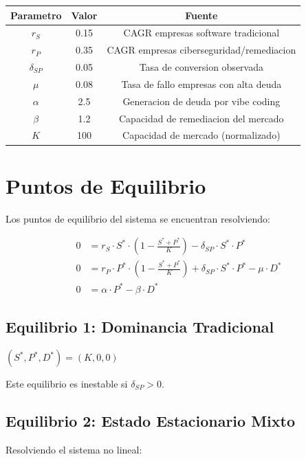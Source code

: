 \documentclass{article}
\begin{document}
\begin{table}[h]
\centering
\begin{tabular}{|c|c|c|}
\hline
\textbf{Parametro} & \textbf{Valor} & \textbf{Fuente} \\
\hline
$r_S$ & 0.15 & CAGR empresas software tradicional \\
$r_P$ & 0.35 & CAGR empresas ciberseguridad/remediacion \\
$\delta_{SP}$ & 0.05 & Tasa de conversion observada \\
$\mu$ & 0.08 & Tasa de fallo empresas con alta deuda \\
$\alpha$ & 2.5 & Generacion de deuda por vibe coding \\
$\beta$ & 1.2 & Capacidad de remediacion del mercado \\
$K$ & 100 & Capacidad de mercado (normalizado) \\
\hline
\end{tabular}
\end{table}

\section{Puntos de Equilibrio}

Los puntos de equilibrio del sistema se encuentran resolviendo:

\begin{align}
0 &= r_S \cdot S^* \cdot \left(1 - \frac{S^* + P^*}{K}\right) - \delta_{SP} \cdot S^* \cdot P^* \\
0 &= r_P \cdot P^* \cdot \left(1 - \frac{S^* + P^*}{K}\right) + \delta_{SP} \cdot S^* \cdot P^* - \mu \cdot D^* \\
0 &= \alpha \cdot P^* - \beta \cdot D^*
\end{align}

\subsection{Equilibrio 1: Dominancia Tradicional}

$(S^*, P^*, D^*) = (K, 0, 0)$

Este equilibrio es inestable si $\delta_{SP} > 0$.

\subsection{Equilibrio 2: Estado Estacionario Mixto}

Resolviendo el sistema no lineal:
\end{document}
